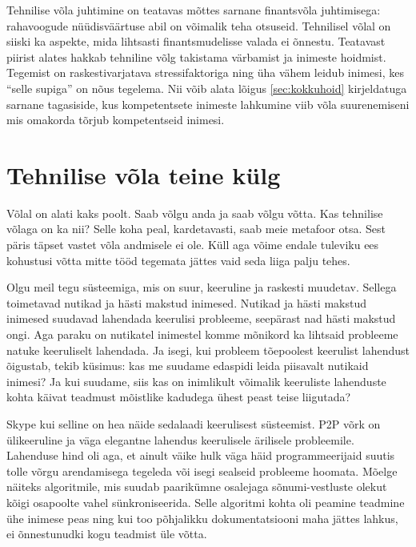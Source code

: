 Tehnilise võla juhtimine on teatavas mõttes sarnane finantsvõla juhtimisega: rahavoogude nüüdisväärtuse abil on võimalik teha otsuseid. Tehnilisel võlal on siiski ka aspekte, mida lihtsasti finantsmudelisse valada ei õnnestu. Teatavast piirist alates hakkab tehniline võlg takistama värbamist ja inimeste hoidmist. Tegemist on raskestivarjatava stressifaktoriga ning üha vähem leidub inimesi, kes \enquote{selle supiga} on nõus tegelema. Nii võib alata lõigus \ref{sec:kokkuhoid} kirjeldatuga sarnane tagasiside, kus kompetentsete inimeste lahkumine viib võla suurenemiseni mis omakorda tõrjub kompetentseid inimesi. 

\section{Tehnilise võla teine külg}
Võlal on alati kaks poolt. Saab võlgu anda ja saab võlgu võtta. Kas tehnilise võlaga on ka nii? Selle koha peal, kardetavasti, saab meie metafoor otsa. Sest päris täpset vastet võla andmisele ei ole. Küll aga võime endale tuleviku ees kohustusi võtta mitte tööd tegemata jättes vaid seda liiga palju tehes. 

Olgu meil tegu süsteemiga, mis on suur, keeruline ja raskesti muudetav. Sellega toimetavad nutikad ja hästi makstud inimesed. Nutikad ja hästi makstud inimesed suudavad lahendada keerulisi probleeme, seepärast nad hästi makstud ongi. Aga paraku on nutikatel inimestel komme mõnikord ka lihtsaid probleeme natuke keeruliselt lahendada. Ja isegi, kui probleem tõepoolest keerulist lahendust õigustab, tekib küsimus: kas me suudame edaspidi leida piisavalt nutikaid inimesi? Ja kui suudame, siis kas on inimlikult võimalik keeruliste lahenduste kohta käivat teadmust mõistlike kadudega ühest peast teise liigutada? 

Skype kui selline on hea näide sedalaadi keerulisest süsteemist. P2P võrk on ülikeeruline ja väga elegantne lahendus keerulisele ärilisele probleemile. Lahenduse hind oli aga, et ainult väike hulk väga häid programmeerijaid suutis tolle võrgu arendamisega tegeleda või isegi sealseid probleeme hoomata. Mõelge näiteks algoritmile, mis suudab paarikümne osalejaga sõnumi-vestluste olekut kõigi osapoolte vahel sünkroniseerida. Selle algoritmi kohta oli peamine teadmine ühe inimese peas ning kui too põhjalikku dokumentatsiooni maha jättes lahkus, ei õnnestunudki kogu teadmist üle võtta.

